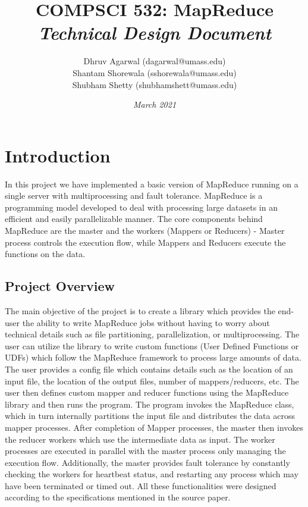 \documentclass[a4paper,12pt]{article}
\title{%
\textbf{COMPSCI 532: MapReduce}\\
\large \textit{\textbf{Technical Design Document}}}
\author{Dhruv Agarwal (dagarwal@umass.edu)\\
Shantam Shorewala (sshorewala@umass.edu)\\
Shubham Shetty (shubhamshett@umass.edu)}
\date{\textit{March 2021}}
\begin{document}
    \begin{titlepage}
        \maketitle
        \thispagestyle{empty}
    \end{titlepage}

\newpage

\setcounter{page}{1}
\cfoot{\thepage}

\section{Introduction}
In this project we have implemented a basic version of MapReduce running on a single server with multiprocessing and fault tolerance. MapReduce is a programming model developed to deal with processing large datasets in an efficient and easily parallelizable manner. The core components behind MapReduce are the master and the workers (Mappers or Reducers) - Master process controls the execution flow, while Mappers and Reducers execute the functions on the data.

\subsection{Project Overview}
The main objective of the project is to create a library which provides the end-user the ability to write MapReduce jobs without having to worry about technical details such as file partitioning, parallelization, or multiprocessing. The user can utilize the library to write custom functions (User Defined Functions or UDFs) which follow the MapReduce framework to process large amounts of data.\\

The user provides a config file which contains details such as the location of an input file, the location of the output files, number of mappers/reducers, etc. The user then defines custom mapper and reducer functions using the MapReduce library and then runs the program. The program invokes the MapReduce class, which in turn internally partitions the input file and distributes the data across mapper processes. After completion of Mapper processes, the master then invokes the reducer workers which use the intermediate data as input. The worker processes are executed in parallel with the master process only managing the execution flow. Additionally, the master provides fault tolerance by constantly checking the workers for heartbeat status, and restarting any process which may have been terminated or timed out. All these functionalities were designed according to the specifications mentioned in the source paper.
\end{document}
